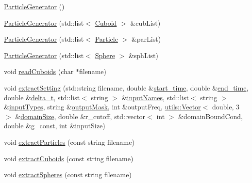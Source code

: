 \begin{DoxyCompactItemize}
\item 
\hyperlink{classutils_1_1ParticleGenerator_a66cee361b12e3294bc7a2259d401fe02}{Particle\-Generator} ()
\item 
\hyperlink{classutils_1_1ParticleGenerator_a1c12068bec5fd0df8d9a34d4bfb7f726}{Particle\-Generator} (std\-::list$<$ \hyperlink{classCuboid}{Cuboid} $>$ \&cub\-List)
\item 
\hyperlink{classutils_1_1ParticleGenerator_a0eba44befd40227a167f9f562d718515}{Particle\-Generator} (std\-::list$<$ \hyperlink{classParticle}{Particle} $>$ \&par\-List)
\item 
\hyperlink{classutils_1_1ParticleGenerator_ac9560217a90a901d9a65247028468106}{Particle\-Generator} (std\-::list$<$ \hyperlink{classSphere}{Sphere} $>$ \&sph\-List)
\item 
void \hyperlink{classutils_1_1ParticleGenerator_a405c1b60bfbd08c2c31fefb927290945}{read\-Cuboids} (char $\ast$filename)
\item 
void \hyperlink{classutils_1_1ParticleGenerator_a47095ba94d78941e9ce4f08b25fccc33}{extract\-Setting} (std\-::string filename, double \&\hyperlink{MolSim_8cpp_a00b0c9b1c3ea8bb73a7fc8b53a3961fd}{start\-\_\-time}, double \&\hyperlink{MolSim_8cpp_a8c7ea5e69ce954c1d81db1732f9f426a}{end\-\_\-time}, double \&\hyperlink{MolSim_8cpp_a4cfc079302fe9a34fe24637c4e44303a}{delta\-\_\-t}, std\-::list$<$ string $>$ \&\hyperlink{MolSim_8cpp_a448cf355949f9675fa5f3d5599923d75}{input\-Names}, std\-::list$<$ string $>$ \&\hyperlink{MolSim_8cpp_ad5280d724148f1f34eb9e36fba1e9bf1}{input\-Types}, string \&\hyperlink{MolSim_8cpp_ac7d2734291385dce3211bcb0884021c1}{output\-Mask}, int \&output\-Freq, \hyperlink{classutils_1_1Vector}{utils\-::\-Vector}$<$ double, 3 $>$ \&\hyperlink{MolSim_8cpp_a62ca172a74e96becbd5ebbae3052bbd3}{domain\-Size}, double \&r\-\_\-cutoff, std\-::vector$<$ int $>$ \&domain\-Bound\-Cond, double \&g\-\_\-const, int \&\hyperlink{MolSim_8cpp_ad255f675bdb1dcbda2160670f9912985}{input\-Size})
\item 
void \hyperlink{classutils_1_1ParticleGenerator_a5b99fee3ef17845bff2ef6ed4e8f9d04}{extract\-Particles} (const string filename)
\item 
void \hyperlink{classutils_1_1ParticleGenerator_addad87e40dc0c5d49e5df4533121771d}{extract\-Cuboids} (const string filename)
\item 
void \hyperlink{classutils_1_1ParticleGenerator_a93d2efd2781548606dc52f4a6ab3ca57}{extract\-Spheres} (const string filename)
\item 

\end{DoxyCompactItemize}
